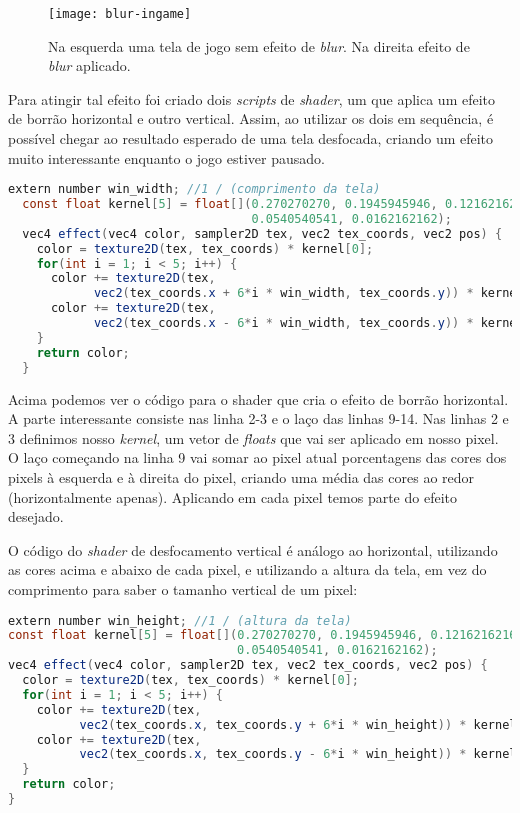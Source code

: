 \begin{figure}[h]
\texttt{[image: blur-ingame]}
\centering
\caption{Na esquerda uma tela de jogo sem efeito de \textit{blur}. Na direita efeito de \textit{blur} aplicado.}
\end{figure}

Para atingir tal efeito foi criado dois \textit{scripts} de \textit{shader}, um que aplica um efeito de borrão horizontal e outro vertical. Assim, ao utilizar os dois em sequência, é possível chegar ao resultado esperado de uma tela desfocada, criando um efeito muito interessante enquanto o jogo estiver pausado.

\begin{lstlisting}[language=java]
  extern number win_width; //1 / (comprimento da tela)
  const float kernel[5] = float[](0.270270270, 0.1945945946, 0.1216216216,
                                  0.0540540541, 0.0162162162);
  vec4 effect(vec4 color, sampler2D tex, vec2 tex_coords, vec2 pos) {
    color = texture2D(tex, tex_coords) * kernel[0];
    for(int i = 1; i < 5; i++) {
      color += texture2D(tex,
            vec2(tex_coords.x + 6*i * win_width, tex_coords.y)) * kernel[i];
      color += texture2D(tex,
            vec2(tex_coords.x - 6*i * win_width, tex_coords.y)) * kernel[i];
    }
    return color;
  }
\end{lstlisting}

Acima podemos ver o código para o shader que cria o efeito de borrão horizontal. A parte interessante consiste nas linha 2-3 e o laço das linhas 9-14. Nas linhas 2 e 3 definimos nosso \textit{kernel}, um vetor de \textit{floats} que vai ser aplicado em nosso pixel. O laço começando na linha 9 vai somar ao pixel atual porcentagens das cores dos pixels à esquerda e à direita do pixel, criando uma média das cores ao redor (horizontalmente apenas). Aplicando em cada pixel temos parte do efeito desejado.

O código do \textit{shader} de desfocamento vertical é análogo ao horizontal, utilizando as cores acima e abaixo de cada pixel, e utilizando a altura da tela, em vez do comprimento para saber o tamanho vertical de um pixel:

\begin{lstlisting}[language=java]
extern number win_height; //1 / (altura da tela)
const float kernel[5] = float[](0.270270270, 0.1945945946, 0.1216216216,
                                0.0540540541, 0.0162162162);
vec4 effect(vec4 color, sampler2D tex, vec2 tex_coords, vec2 pos) {
  color = texture2D(tex, tex_coords) * kernel[0];
  for(int i = 1; i < 5; i++) {
    color += texture2D(tex,
          vec2(tex_coords.x, tex_coords.y + 6*i * win_height)) * kernel[i];
    color += texture2D(tex,
          vec2(tex_coords.x, tex_coords.y - 6*i * win_height)) * kernel[i];
  }
  return color;
}
\end{lstlisting}

